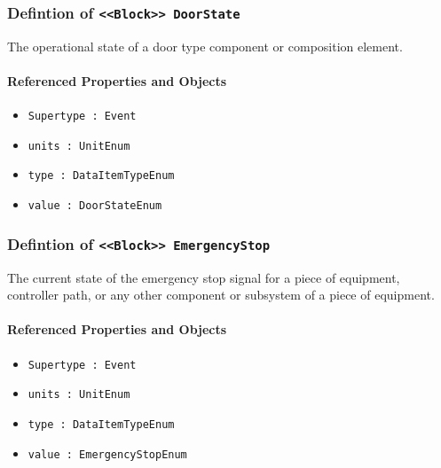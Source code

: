 \subsubsection{Defintion of \texttt{<<Block>> DoorState}}
  \label{type:DoorState}

\FloatBarrier

The operational state of a door type component or composition element.

\FloatBarrier
\paragraph{Referenced Properties and Objects}

\begin{itemize}
\item \texttt{Supertype : Event}

\item \texttt{units : UnitEnum}

\item \texttt{type : DataItemTypeEnum}

\item \texttt{value : DoorStateEnum}

\end{itemize}
\FloatBarrier
\subsubsection{Defintion of \texttt{<<Block>> EmergencyStop}}
  \label{type:EmergencyStop}

\FloatBarrier

The current state of the emergency stop signal for a piece of equipment, controller path, or any other component or subsystem of a piece of equipment.

\FloatBarrier
\paragraph{Referenced Properties and Objects}

\begin{itemize}
\item \texttt{Supertype : Event}

\item \texttt{units : UnitEnum}

\item \texttt{type : DataItemTypeEnum}

\item \texttt{value : EmergencyStopEnum}

\end{itemize}
\FloatBarrier
